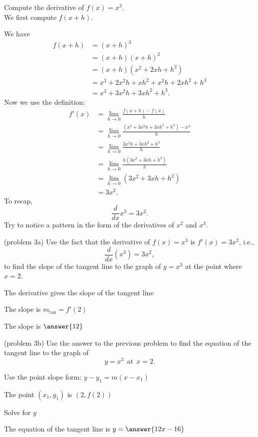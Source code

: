 \documentclass[handout]{ximera}
\begin{document}
\begin{example}[example 3]
Compute the derivative of  $f(x) = x^3$.\\
We first compute $f(x+h)$.

We have
\begin{align*}
f(x+h) &= (x+h)^3  \\
       &= (x+h)(x+h)^2 \\
			&= (x+h)(x^2 + 2xh + h^2)\\
			&= x^3 + 2x^2h + xh^2 + x^2h + 2xh^2 + h^3\\
			&= x^3 + 3x^2h + 3xh^2 + h^3.
\end{align*}
Now we use the definition:
\begin{align*}
f'(x) &= \lim_{h \to 0} \frac{f(x+h)-f(x)}{h}\\[5pt]
&= \lim_{h \to 0} \frac{(x^3 + 3x^2h + 3xh^2 + h^3)- x^3}{h}\\[5pt]
&= \lim_{h \to 0} \frac{3x^2h + 3xh^2 + h^3}{h}\\[5pt]
&= \lim_{h \to 0} \frac{h(3x^2 + 3xh + h^2)}{h}\\[5pt]
&= \lim_{h \to 0} (3x^2 + 3xh + h^2) \\
&= 3x^2.
\end{align*}
To recap, 
\[
\frac{d}{dx}x^3 = 3x^2.
\]
Try to notice a pattern in the form of the derivatives of $x^2$ and $x^3$.

\end{example}




\begin{problem}(problem 3a)
Use the fact that the derivative of $f(x) = x^3$ is $f'(x) = 3x^2$,
i.e., 
\[
\frac{d}{dx}\left( x^3 \right) = 3x^2,
\]
to find the slope of the tangent line to the graph of 
$y = x^3$ at the point where $x = 2$.\\
\begin{hint}
The derivative gives the slope of the tangent line
\end{hint}
\begin{hint}
The slope is $m_{\text{tan}} = f'(2)$
\end{hint}
The slope is $\answer{12}$
\end{problem}




\begin{problem}(problem 3b)
Use the answer to the previous problem to find the equation of the tangent line to the graph of 
\[
y = x^3 \ \ \text{at} \ \ x=2.
\]
\begin{hint}
Use the point slope form: $y-y_1 = m(x-x_1)$
\end{hint}
\begin{hint}
The point $(x_1,y_1)$ is $(2, f(2))$
\end{hint}
\begin{hint}
Solve for $y$
\end{hint}
The equation of the tangent line is \; $y = \answer{12x-16}$
\end{problem}
\end{document}
